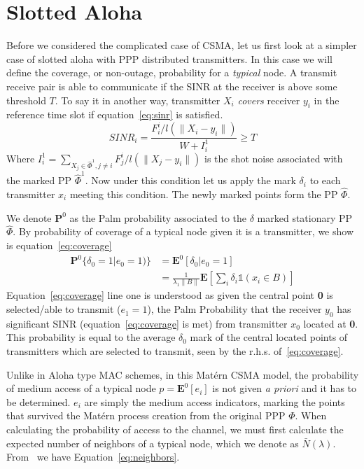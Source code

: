 \section{Slotted Aloha}
%
Before we considered the complicated case of CSMA, let us first look at a simpler case of slotted aloha with PPP distributed transmitters.  In this case we will define the coverage, or non-outage, probability for a \textit{typical} node.  A transmit receive pair is able to communicate if the SINR at the receiver is above some threshold $T$.  To say it in another way, transmitter $X_i$ \textit{covers} receiver $y_i$ in the reference time slot if equation~\eqref{eq:sinr} is satisfied.
%
\begin{equation}\label{eq:sinr}
  SINR_i = \frac{F_i^i/l(\|X_i - y_i\|)}{W + I_i^1} \geq T
\end{equation}
%
Where $I_i^1 = \sum_{X_j \in \hat{\Phi}^1,j \neq i} F_j^i/l(\|X_j-y_i\|) $ is the shot noise associated with the marked PP $\hat{\Phi}^1$. Now under this condition let us apply the mark $\delta_i$ to each transmitter $x_i$ meeting this condition.  The newly marked points form the PP $\hat{\Phi}$.
%
%
\par
%
We denote $\textbf{P}^0$ as the Palm probability associated to the $\delta$ marked stationary PP $\hat{\Phi}$.  By probability of coverage of a typical node given it is a transmitter, we show is equation~\eqref{eq:coverage}
%
\begin{equation}\label{eq:coverage}
  \begin{split}
  \textbf{P}^0\{\delta_0=1|e_0=1)\} &= \textbf{E}^0[\delta_0|e_0=1] \\
  &= \frac{1}{\lambda_1\|B\|}\textbf{E}[\sum_i \delta_i \mathbb{1}(x_i \in B)]
\end{split}
\end{equation}
%
Equation~\eqref{eq:coverage} line one is understood as given the central point \textbf{0} is selected/able to transmit ($e_1=1$), the Palm Probability that the receiver $y_0$ has significant SINR (equation~\eqref{eq:coverage} is met) from transmitter $x_0$ located at \textbf{0}.  This probability is equal to the average $\delta_0$ mark of the central located points of transmitters which are selected to transmit, seen by the r.h.s. of~\eqref{eq:coverage}.\par
%
Unlike in Aloha type MAC schemes, in this Mat\'ern CSMA model, the probability of medium access of a typical node $p = \textbf{E}^0[e_i]$ is not given \textit{a priori} and it has to be determined.  $e_i$ are simply the medium access indicators, marking the points that survived the Mat\'ern process creation from the original PPP $\Phi$.  When calculating the probability of access to the channel, we must first calculate the expected number of neighbors of a typical node, which we denote as $\bar{N}(\lambda)$.  From~\cite{baccelli2009stochasticVII} we have Equation~\eqref{eq:neighbors}.
